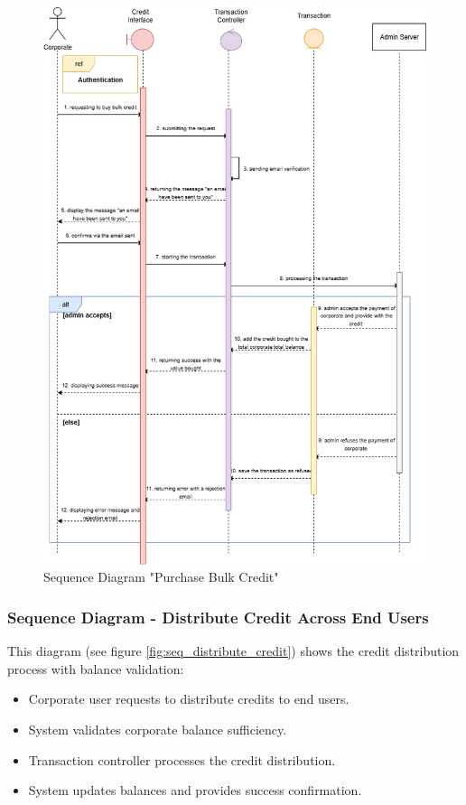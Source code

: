 \begin{figure}[H] 
  \centering
  \includegraphics[width=\textwidth,keepaspectratio]{images/seq_purchase_bulk_credit.png}
  \caption{Sequence Diagram "Purchase Bulk Credit"}
  \label{fig:seq_purchase_bulk_credit}
\end{figure}

\subsubsection{Sequence Diagram - Distribute Credit Across End Users}
This diagram (see figure \ref{fig:seq_distribute_credit}) shows the credit distribution process with balance validation:
\begin{itemize}[nosep,leftmargin=*]
  \item Corporate user requests to distribute credits to end users.
  \item System validates corporate balance sufficiency.
  \item Transaction controller processes the credit distribution.
  \item System updates balances and provides success confirmation.
\end{itemize}

